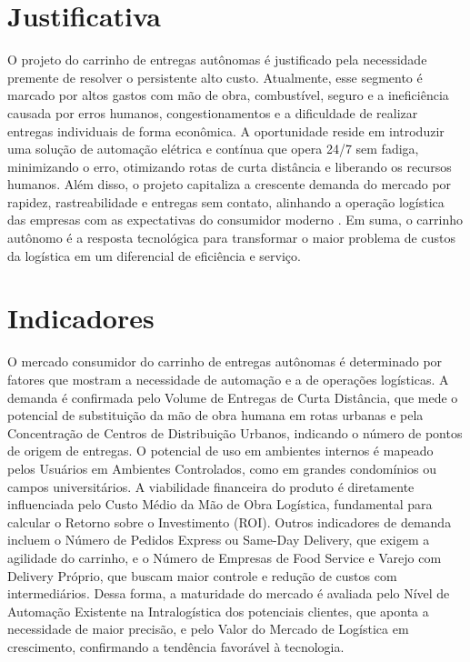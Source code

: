 
\section{Justificativa}

O projeto do carrinho de entregas autônomas é justificado pela necessidade premente de resolver o persistente alto custo. Atualmente, esse segmento é marcado por altos gastos com mão de obra, combustível, seguro e a ineficiência causada por erros humanos, congestionamentos e a dificuldade de realizar entregas individuais de forma econômica. A oportunidade reside em introduzir uma solução de automação elétrica e contínua que opera 24/7 sem fadiga, minimizando o erro, otimizando rotas de curta distância e liberando os recursos humanos. Além disso, o projeto capitaliza a crescente demanda do mercado por rapidez, rastreabilidade e entregas sem contato, alinhando a operação logística das empresas com as expectativas do consumidor moderno . Em suma, o carrinho autônomo é a resposta tecnológica para transformar o maior problema de custos da logística em um diferencial de eficiência e serviço.


\section{Indicadores}

O mercado consumidor do carrinho de entregas autônomas é determinado por fatores que mostram a necessidade de automação e a de operações logísticas. A demanda é confirmada pelo Volume de Entregas de Curta Distância, que mede o potencial de substituição da mão de obra humana em rotas urbanas e pela Concentração de Centros de Distribuição Urbanos, indicando o número de pontos de origem de entregas. O potencial de uso em ambientes internos é mapeado pelos Usuários em Ambientes Controlados, como em grandes condomínios ou campos universitários. A viabilidade financeira do produto é diretamente influenciada pelo Custo Médio da Mão de Obra Logística, fundamental para calcular o Retorno sobre o Investimento (ROI).  Outros indicadores de demanda incluem o Número de Pedidos Express ou Same-Day Delivery, que exigem a agilidade do carrinho, e o Número de Empresas de Food Service e Varejo com Delivery Próprio, que buscam maior controle e redução de custos com intermediários. Dessa forma, a maturidade do mercado é avaliada pelo Nível de Automação Existente na Intralogística dos potenciais clientes, que aponta a necessidade de maior precisão, e pelo Valor do Mercado de Logística em crescimento, confirmando a tendência favorável à tecnologia.

